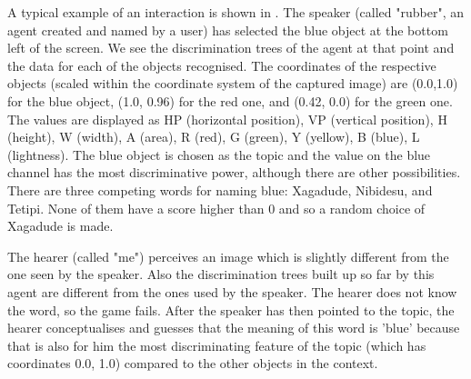 A typical example of an interaction is shown in . 
The speaker (called "rubber", an agent created and named by a user) has selected the blue object at the bottom left 
of the screen. We see the discrimination trees of the agent at that point and the data for each of the objects 
recognised. The coordinates of the respective objects (scaled within the coordinate system of 
the captured image) are (0.0,1.0) for the blue object, (1.0, 0.96) for the red one, and (0.42, 0.0) for the green one. 
The values are displayed as HP (horizontal position), VP (vertical position), H (height), W (width), A (area), 
R (red), G (green), Y (yellow), B (blue), L (lightness). 
The blue object is chosen as the topic and the value on the blue channel has the most discriminative power, although 
there are other possibilities. There are three competing words for naming blue: Xagadude, Nibidesu, and Tetipi. 
None of them have a score higher than 0 and so a random choice of Xagadude is made. 

The hearer (called "me") perceives an image which is slightly different from 
the one seen by the speaker. Also the discrimination trees built up so far by this agent are different from the ones used
by the speaker. The hearer does not know the word, so the game fails. After the speaker has then pointed to the 
topic, the hearer conceptualises and guesses that the meaning of this word is 'blue' because that is also for him the most 
discriminating feature of the topic (which has coordinates 0.0, 1.0) compared to the other objects in the context. 


